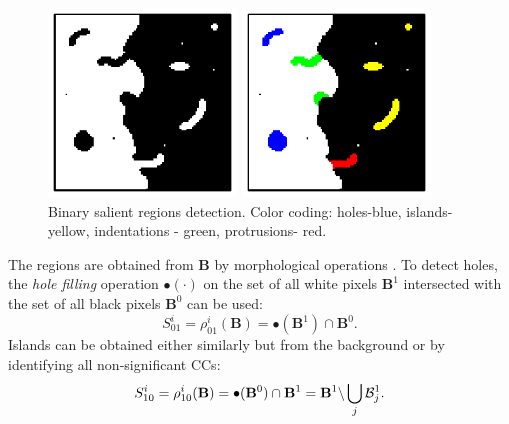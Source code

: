 \documentclass[conference,compsoc]{IEEEtran}
\newcommand {\be}{\begin{equation}}
\newcommand {\ee}{\end{equation}}
\def\B{{\mathbf B}}
\begin{document}
\begin{figure}[htb]
\begin{minipage}[b]{.49\linewidth}
  \centering
  \centerline{\includegraphics[width=5cm]{binary_marks}}

\end{minipage}
\begin{minipage}[b]{0.49\linewidth}
  \centering
  \centerline{\includegraphics[width=5cm]{binary_marks_clean_color_coded}}

\end{minipage}
\caption{Binary salient regions detection.
Color coding: holes-blue, islands- yellow,
indentations - green, protrusions- red. }
\label{fig:binary_sal}
\end{figure}
The regions are obtained from $\B$ by morphological operations \cite{Soille}. To detect holes, the {\em hole filling}
operation $\bullet (\cdot)$ on the set of all white pixels $\B ^1$ intersected with the set of all black pixels $\B^0$ can be used:
\be
S^i_{01} = \rho^i_{01}(\B)= \bullet(\B ^1) \cap \B^0 \label{eqn:sal:inn:01}.
\ee
Islands can be obtained either similarly but from the background or by identifying all non-significant CCs:
\be
S^i_{10} = \rho^i_{10}(\B)= \bullet(\B ^0) \cap \B^1 = \B^1 \backslash \bigcup_j{{\cal B}_j^1} \label{eqn:sal:inn:10}.
\ee
\end{document}

